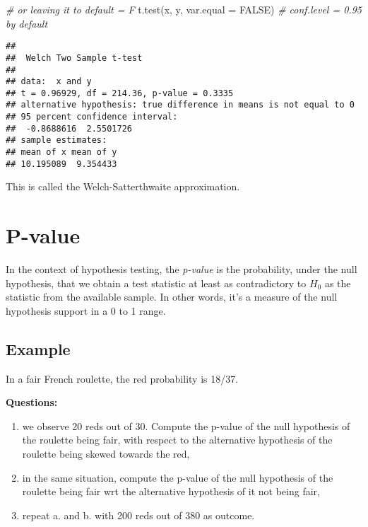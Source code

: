 \documentclass[
  oneside]{book}
\newenvironment{Shaded}{\begin{snugshade}}{\end{snugshade}}
\newcommand{\AttributeTok}[1]{\textcolor[rgb]{0.77,0.63,0.00}{#1}}
\newcommand{\CommentTok}[1]{\textcolor[rgb]{0.56,0.35,0.01}{\textit{#1}}}
\newcommand{\ConstantTok}[1]{\textcolor[rgb]{0.00,0.00,0.00}{#1}}
\newcommand{\FunctionTok}[1]{\textcolor[rgb]{0.00,0.00,0.00}{#1}}
\newcommand{\NormalTok}[1]{#1}
\providecommand{\tightlist}{%
  \setlength{\itemsep}{0pt}\setlength{\parskip}{0pt}}
\begin{document}
\begin{Shaded}
\begin{Highlighting}[]
\CommentTok{\# or leaving it to default = F}
\FunctionTok{t.test}\NormalTok{(x, y, }\AttributeTok{var.equal =} \ConstantTok{FALSE}\NormalTok{) }\CommentTok{\# conf.level = 0.95 by default}
\end{Highlighting}
\end{Shaded}

\begin{verbatim}
## 
##  Welch Two Sample t-test
## 
## data:  x and y
## t = 0.96929, df = 214.36, p-value = 0.3335
## alternative hypothesis: true difference in means is not equal to 0
## 95 percent confidence interval:
##  -0.8688616  2.5501726
## sample estimates:
## mean of x mean of y 
## 10.195089  9.354433
\end{verbatim}

This is called the Welch-Satterthwaite approximation.

\hypertarget{p-value}{%
\section{P-value}\label{p-value}}

In the context of hypothesis testing, the \emph{p-value} is the probability,
under the null hypothesis, that we obtain a test statistic at least as
contradictory to \(H_0\) as the statistic from the available sample.
In other words, it's a measure of the null hypothesis support in a 0 to 1 range.

\hypertarget{example-2}{%
\subsection{Example}\label{example-2}}

In a fair French roulette, the red probability is 18/37.

\textbf{Questions:}

\begin{enumerate}
\def\labelenumi{\alph{enumi}.}
\tightlist
\item
  we observe 20 reds out of 30. Compute the p-value of the null hypothesis
  of the roulette being fair, with respect to the alternative hypothesis
  of the roulette being skewed towards the red,
\item
  in the same situation, compute the p-value of the null hypothesis
  of the roulette being fair wrt the alternative hypothesis of it not
  being fair,
\item
  repeat a. and b. with 200 reds out of 380 as outcome.
\end{enumerate}
\end{document}
